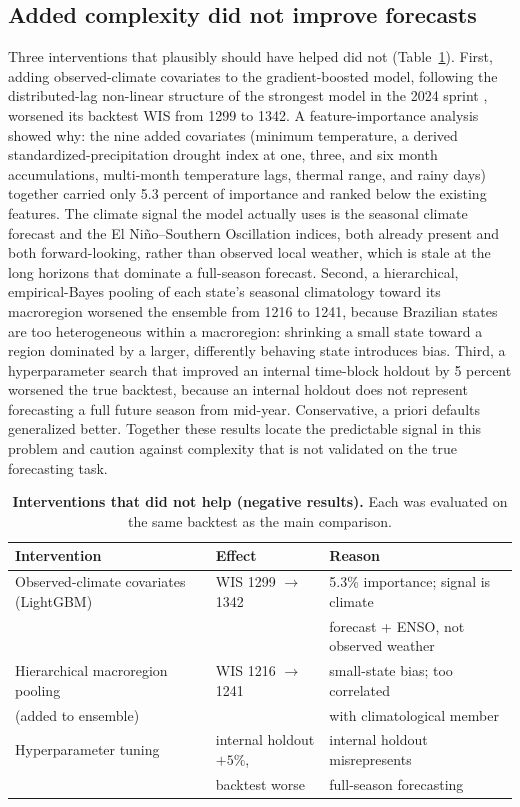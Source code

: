 \documentclass[11pt]{article}
\begin{document}
\subsection{Added complexity did not improve forecasts}\label{sec:negative}
Three interventions that plausibly should have helped did not (Table~\ref{tab:ablation}). First,
adding observed-climate covariates to the gradient-boosted model, following the distributed-lag
non-linear structure of the strongest model in the 2024 sprint \citep{araujo2026,gasparrini2010},
worsened its backtest WIS from 1299 to 1342. A feature-importance analysis showed why: the nine
added covariates (minimum temperature, a derived standardized-precipitation drought index at one,
three, and six month accumulations, multi-month temperature lags, thermal range, and rainy days)
together carried only 5.3 percent of importance and ranked below the existing features. The climate
signal the model actually uses is the seasonal climate forecast and the El Ni\~no--Southern
Oscillation indices, both already present and both forward-looking, rather than observed local
weather, which is stale at the long horizons that dominate a full-season forecast. Second, a
hierarchical, empirical-Bayes pooling of each state's seasonal climatology toward its macroregion
worsened the ensemble from 1216 to 1241, because Brazilian states are too heterogeneous within a
macroregion: shrinking a small state toward a region dominated by a larger, differently behaving
state introduces bias. Third, a hyperparameter search that improved an internal time-block holdout
by 5 percent worsened the true backtest, because an internal holdout does not represent forecasting
a full future season from mid-year. Conservative, a priori defaults generalized better. Together
these results locate the predictable signal in this problem and caution against complexity that is
not validated on the true forecasting task.

\begin{table}[t]
\centering\small
\caption{\textbf{Interventions that did not help (negative results).} Each was evaluated on the same
backtest as the main comparison.}
\label{tab:ablation}
\begin{tabular}{@{}lll@{}}
\toprule
\textbf{Intervention} & \textbf{Effect} & \textbf{Reason} \\
\midrule
Observed-climate covariates (LightGBM) & WIS 1299 $\rightarrow$ 1342 & 5.3\% importance; signal is climate \\
 & & forecast + ENSO, not observed weather \\
Hierarchical macroregion pooling & WIS 1216 $\rightarrow$ 1241 & small-state bias; too correlated \\
 (added to ensemble) & & with climatological member \\
Hyperparameter tuning & internal holdout $+5\%$, & internal holdout misrepresents \\
 & backtest worse & full-season forecasting \\
\bottomrule
\end{tabular}
\end{table}
\end{document}
